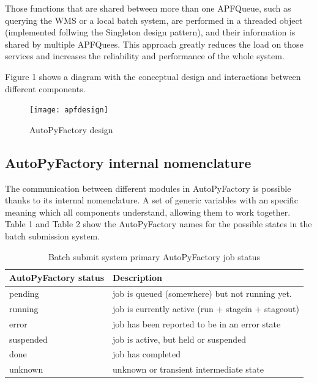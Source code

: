 \documentclass[a4paper]{jpconf}
\begin{document}
Those functions that are shared between more than one APFQueue, such
as querying the WMS or a local batch system,
are performed in a threaded object (implemented follwing the Singleton design
pattern), and their information is shared by multiple APFQuees. This approach
greatly reduces the load on those services and increases the reliability and performance of the whole system.

Figure 1 shows a diagram with the conceptual design and 
interactions between different components.

\begin{figure}[h]
\centering\texttt{[image: apfdesign]}
\caption{AutoPyFactory design}
\label{apfdesign}
\end{figure}

\subsection{AutoPyFactory internal nomenclature}

The communication between different modules in AutoPyFactory 
is possible thanks to its internal nomenclature.
A set of generic variables with an specific meaning which all components 
understand, allowing them to work together. 
Table 1 and Table 2 show the AutoPyFactory names for the
possible states in the batch submission system. 

\begin{table}[h]
   \begin{center}
      \begin{tabular}{l l}
         \hline
         \textbf{AutoPyFactory status} & \textbf{Description} \\ 
         \hline
         pending      &     job is queued (somewhere) but not running yet.      \\  
         running      &     job is currently active (run + stagein + stageout)  \\ 
         error        &     job has been reported to be in an error state       \\ 
         suspended    &     job is active, but held or suspended                \\ 
         done         &     job has completed                                   \\ 
         unknown      &     unknown or transient intermediate state             \\ 
         \hline
      \end{tabular}
   \end{center}
   \caption{Batch submit system primary AutoPyFactory job status}
   \label{job secondary status}
\end{table}
\end{document}
